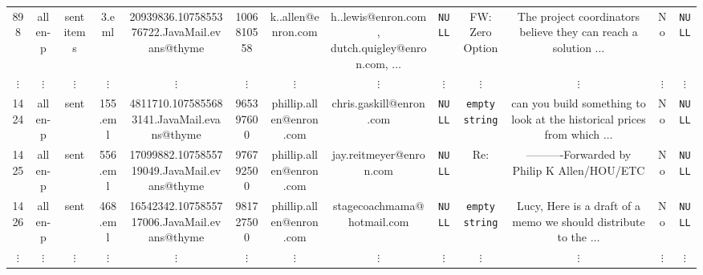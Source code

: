 \documentclass{standalone}
\begin{document}
\begin{tabular}{|c|c|c|c|c|c|c|c|c| c|c|c|c|}
898 & allen-p & sent items &3.eml & 20939836.1075855376722.JavaMail.evans@thyme &1006810558 & k..allen@enron.com & h..lewis@enron.com, dutch.quigley@enron.com, $\ldots$ & \texttt{NULL} & FW: Zero Option & The project coordinators believe they can reach a solution $\ldots$ & No & \texttt{NULL}
\\
$\vdots$ & $\vdots$ & $\vdots$ & $\vdots$ & $\vdots$ & $\vdots$ & $\vdots$ & $\vdots$ & $\vdots$ & $\vdots$ & $\vdots$ & $\vdots$ & $\vdots$  \\ 
%
1424&allen-p&sent&155.eml&4811710.1075855683141.JavaMail.evans@thyme&965397600&phillip.allen@enron.com&chris.gaskill@enron.com&\texttt{NULL}& \texttt{empty string} & can you build something to look at the historical prices from which $\ldots$ & No&\texttt{NULL}
\\
1425&allen-p&sent&556.eml&17099882.1075855719049.JavaMail.evans@thyme&976792500&phillip.allen@enron.com&jay.reitmeyer@enron.com&\texttt{NULL}&Re: & ----------Forwarded by Philip K Allen/HOU/ETC & No&\texttt{NULL}
\\
1426&allen-p&sent&468.eml&16542342.1075855717006.JavaMail.evans@thyme&981727500&phillip.allen@enron.com&stagecoachmama@hotmail.com&\texttt{NULL}& \texttt{empty string} & Lucy, Here is a draft of a memo we should distribute to the $\ldots$ & No&\texttt{NULL}
\\
$\vdots$ & $\vdots$ & $\vdots$ & $\vdots$ & $\vdots$ & $\vdots$ & $\vdots$ & $\vdots$ & $\vdots$ & $\vdots$ & $\vdots$ & $\vdots$ & $\vdots$  \\ \hline
\end{tabular}
\end{document}
